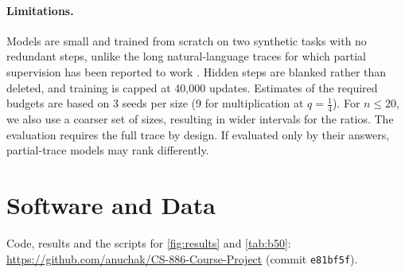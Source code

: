 \documentclass{article}
\begin{document}
\paragraph{Limitations.}
Models are small and trained from scratch on two synthetic tasks with no redundant steps, unlike the long natural-language traces for which partial supervision has 
been reported to work \citep{hwang2026revisiting}. Hidden steps are blanked rather than deleted, and training is capped at 40{,}000 updates. Estimates of the required 
budgets are based on 3 seeds per size (9 for multiplication at $q=\tfrac14$). For $n\le20$, we also use a coarser set of sizes, resulting in wider intervals for the 
ratios. The evaluation requires the full trace by design. If evaluated only by their answers, partial-trace models may rank differently.

\section*{Software and Data}
Code, results and the scripts for \cref{fig:results} and \cref{tab:b50}:\\
\url{https://github.com/anuchak/CS-886-Course-Project} (commit \texttt{e81bf5f}).



\end{document}
